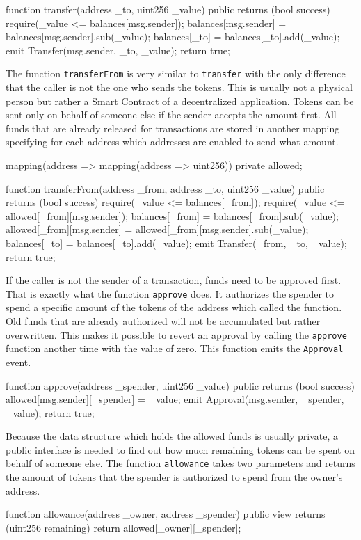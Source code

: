 \begin{GenericCode}
function transfer(address _to, uint256 _value) public returns (bool success) {
  require(_value <= balances[msg.sender]);
  balances[msg.sender] = balances[msg.sender].sub(_value);
  balances[_to] = balances[_to].add(_value);
  emit Transfer(msg.sender, _to, _value);
  return true;
}
\end{GenericCode}

The function \texttt{transferFrom} is very similar to \texttt{transfer} with the only difference that the caller is not the one who sends the tokens. This is usually not a physical person but rather a Smart Contract of a decentralized application. Tokens can be sent only on behalf of someone else if the sender accepts the amount first. All funds that are already released for transactions are stored in another mapping specifying for each address which addresses are enabled to send what amount.

\begin{GenericCode}
mapping(address => mapping(address => uint256)) private allowed;

function transferFrom(address _from, address _to, uint256 _value) public returns (bool success) {
  require(_value <= balances[_from]);
  require(_value <= allowed[_from][msg.sender]);
  balances[_from] = balances[_from].sub(_value);
  allowed[_from][msg.sender] = allowed[_from][msg.sender].sub(_value);
  balances[_to] = balances[_to].add(_value);
  emit Transfer(_from, _to, _value);
  return true;
}
\end{GenericCode}

If the caller is not the sender of a transaction, funds need to be approved first. That is exactly what the function \texttt{approve} does. It authorizes the spender to spend a specific amount of the tokens of the address which called the function. Old funds that are already authorized will not be accumulated but rather overwritten. This makes it possible to revert an approval by calling the \texttt{approve} function another time with the value of zero. This function emits the \texttt{Approval} event.
\begin{GenericCode}
function approve(address _spender, uint256 _value) public returns (bool success) {
  allowed[msg.sender][_spender] = _value;
  emit Approval(msg.sender, _spender, _value);
  return true;
}
\end{GenericCode}

Because the data structure which holds the allowed funds is usually private, a public interface is needed to find out how much remaining tokens can be spent on behalf of someone else. The function \texttt{allowance} takes two parameters and returns the amount of tokens that the spender is authorized to spend from the owner's address.
\begin{GenericCode}
function allowance(address _owner, address _spender) public view returns (uint256 remaining) {
  return allowed[_owner][_spender];
}
\end{GenericCode}


